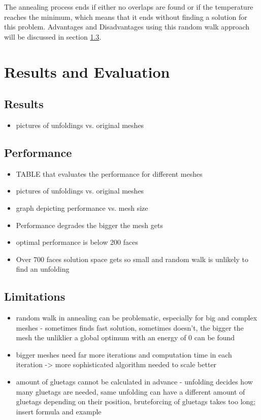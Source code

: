 \documentclass[draft,final]{vutinfth} %
\begin{document}
The annealing process ends if either no overlaps are found or if the temperature reaches the minimum, which means that it ends without finding a solution for this problem. Advantages and Disadvantages using this random walk approach will be discussed in section \ref{sec:limitations}.

\chapter{Results and Evaluation}
\label{chap:reseval}

\section{Results}

\begin{itemize}
	\item pictures of unfoldings vs. original meshes
\end{itemize}

\section{Performance}

\begin{itemize}
	\item TABLE that evaluates the performance for different meshes
	\item pictures of unfoldings vs. original meshes
	\item graph depicting performance vs. mesh size
	\item Performance degrades the bigger the mesh gets
	\item optimal performance is below 200 faces
	\item Over 700 faces solution space gets so small and random walk is unlikely to find an unfolding
\end{itemize}

\section{Limitations}
\label{sec:limitations}
\begin{itemize}
	\item random walk in annealing can be problematic, especially for big and complex meshes - sometimes finds fast solution, sometimes doesn't, the bigger the mesh the unliklier a global optimum with an energy of 0 can be found
	\item bigger meshes need far more iterations and computation time in each iteration -> more sophisticated algorithm needed to scale better
	\item amount of gluetags cannot be calculated in advance - unfolding decides how many gluetags are needed, same unfolding can have a different amount of gluetags depending on their position, bruteforcing of gluetags takes too long; insert formula and example
\end{itemize}
\end{document}
